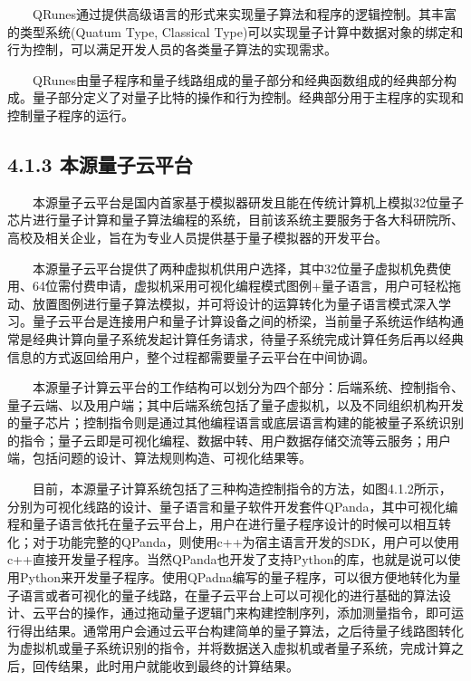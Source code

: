 \documentclass[a4paper,11pt,english]{sphinxmanual}
\begin{document}
\sphinxAtStartPar
  QRunes通过提供高级语言的形式来实现量子算法和程序的逻辑控制。其丰富的类型系统(Quatum Type, Classical Type)可以实现量子计算中数据对象的绑定和行为控制，可以满足开发人员的各类量子算法的实现需求。

\sphinxAtStartPar
  QRunes由量子程序和量子线路组成的量子部分和经典函数组成的经典部分构成。量子部分定义了对量子比特的操作和行为控制。经典部分用于主程序的实现和控制量子程序的运行。


\subsection{4.1.3 本源量子云平台}
\label{\detokenize{rst/4.1_u91cf_u5b50_u8f6f_u4ef6_u5f00_u53d1_u73af_u5883:id2}}
\sphinxAtStartPar
  本源量子云平台是国内首家基于模拟器研发且能在传统计算机上模拟32位量子芯片进行量子计算和量子算法编程的系统，目前该系统主要服务于各大科研院所、高校及相关企业，旨在为专业人员提供基于量子模拟器的开发平台。

\sphinxAtStartPar
  本源量子云平台提供了两种虚拟机供用户选择，其中32位量子虚拟机免费使用、64位需付费申请，虚拟机采用可视化编程模式图例+量子语言，用户可轻松拖动、放置图例进行量子算法模拟，并可将设计的运算转化为量子语言模式深入学习。量子云平台是连接用户和量子计算设备之间的桥梁，当前量子系统运作结构通常是经典计算向量子系统发起计算任务请求，待量子系统完成计算任务后再以经典信息的方式返回给用户，整个过程都需要量子云平台在中间协调。

\sphinxAtStartPar
  本源量子计算云平台的工作结构可以划分为四个部分：后端系统、控制指令、量子云端、以及用户端；其中后端系统包括了量子虚拟机，以及不同组织机构开发的量子芯片；控制指令则是通过其他编程语言或底层语言构建的能被量子系统识别的指令；量子云即是可视化编程、数据中转、用户数据存储交流等云服务；用户端，包括问题的设计、算法规则构造、可视化结果等。

\sphinxAtStartPar
  目前，本源量子计算系统包括了三种构造控制指令的方法，如图4.1.2所示，分别为可视化线路的设计、量子语言和量子软件开发套件QPanda，其中可视化编程和量子语言依托在量子云平台上，用户在进行量子程序设计的时候可以相互转化；对于功能完整的QPanda，则使用c++为宿主语言开发的SDK，用户可以使用c++直接开发量子程序。当然QPanda也开发了支持Python的库，也就是说可以使用Python来开发量子程序。使用QPadna编写的量子程序，可以很方便地转化为量子语言或者可视化的量子线路，在量子云平台上可以可视化的进行基础的算法设计、云平台的操作，通过拖动量子逻辑门来构建控制序列，添加测量指令，即可运行得出结果。通常用户会通过云平台构建简单的量子算法，之后待量子线路图转化为虚拟机或量子系统识别的指令，并将数据送入虚拟机或者量子系统，完成计算之后，回传结果，此时用户就能收到最终的计算结果。
\end{document}
